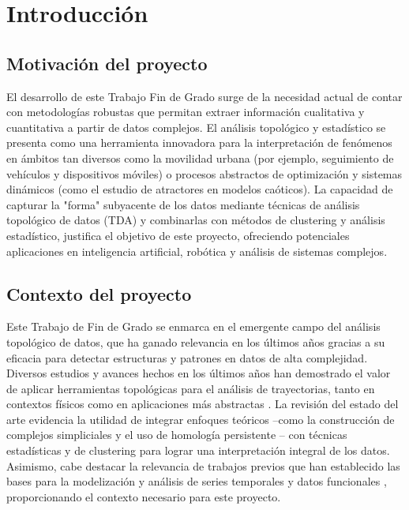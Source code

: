 

\chapter{Introducción} \label{chp:intro}


\section{Motivación del proyecto} \label{sct:intro:motivacion}

El desarrollo de este Trabajo Fin de Grado surge de la necesidad actual de contar con metodologías robustas que permitan extraer información cualitativa y cuantitativa a partir de datos complejos. El análisis topológico y estadístico se presenta como una herramienta innovadora para la interpretación de fenómenos en ámbitos tan diversos como la movilidad urbana (por ejemplo, seguimiento de vehículos y dispositivos móviles) o procesos abstractos de optimización y sistemas dinámicos (como el estudio de atractores en modelos caóticos). La capacidad de capturar la "forma" subyacente de los datos mediante técnicas de análisis topológico de datos (TDA) y combinarlas con métodos de clustering y análisis estadístico, justifica el objetivo de este proyecto, ofreciendo potenciales aplicaciones en inteligencia artificial, robótica y análisis de sistemas complejos.


\section{Contexto del proyecto} \label{sct:intro:contexto}

Este Trabajo de Fin de Grado se enmarca en el emergente campo del análisis topológico de datos, que ha ganado relevancia en los últimos años gracias a su eficacia para detectar estructuras y patrones en datos de alta complejidad. Diversos estudios y avances hechos en los últimos años han demostrado el valor de aplicar herramientas topológicas para el análisis de trayectorias, tanto en contextos físicos como en aplicaciones más abstractas \cite{EsteveFalco2024} . La revisión del estado del arte evidencia la utilidad de integrar enfoques teóricos –como la construcción de complejos simpliciales y el uso de homología persistente – con técnicas estadísticas y de clustering para lograr una interpretación integral de los datos. Asimismo, cabe destacar la relevancia de trabajos previos que han establecido las bases para la modelización y análisis de series temporales y datos funcionales \cite{espinoza2022tda_air}, proporcionando el contexto necesario para este proyecto.

